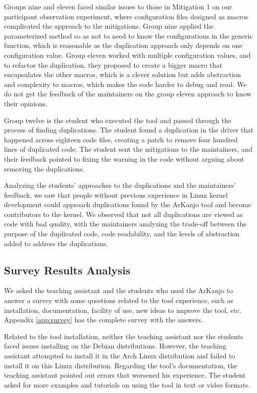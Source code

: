 Groups nine and eleven faced similar issues to those in Mitigation 1 on our participant observation 
experiment, where configuration files designed as macros complicated the approach to the mitigations. 
Group nine applied the parameterized method so as not to need to know the configurations in the 
generic function, which is reasonable as the duplication approach only depends on one configuration 
value. Group eleven worked with multiple configuration values, and to refactor the duplication, 
they proposed to create a bigger macro that encapsulates the other macros, which is a clever 
solution but adds abstraction and complexity to macros, which makes the code harder to debug and read.
We do not get the feedback of the maintainers on the group eleven approach to know their opinions.

Group twelve is the student who executed the tool and passed through the process of finding 
duplications. The student found a duplication in the driver that happened across eighteen code files, 
creating a patch to remove four hundred lines of duplicated code. The student sent the mitigations 
to the maintainers, and their feedback pointed to fixing the warning in the code without arguing 
about removing the duplications.

Analyzing the students' approaches to the duplications and the maintainers' feedback, we saw that 
people without previous experience in Linux kernel development could approach duplications found 
by the ArKanjo tool and become contributors to the kernel. We observed that not all duplications 
are viewed as code with bad quality, with the maintainers analyzing the trade-off between the 
purpose of the duplicated code, code readability, and the levels of abstraction added to 
address the duplications.

\subsection{Survey Results Analysis}

We asked the teaching assistant and the students who used the ArKanjo to answer a survey with 
some questions related to the tool experience, such as installation, documentation, facility of 
use, new ideas to improve the tool, etc. Appendix \ref{app:survey} has the complete survey 
with the answers.

Related to the tool installation, neither the teaching assistant nor the students faced issues 
installing on the Debian distributions. However, the teaching assistant attempted to install it 
in the Arch Linux distribution and failed to install it on this Linux distribution. 
Regarding the tool's documentation, the teaching assistant pointed out errors that worsened his 
experience. The student asked for more examples and tutorials on using the tool in text or 
video formats.

